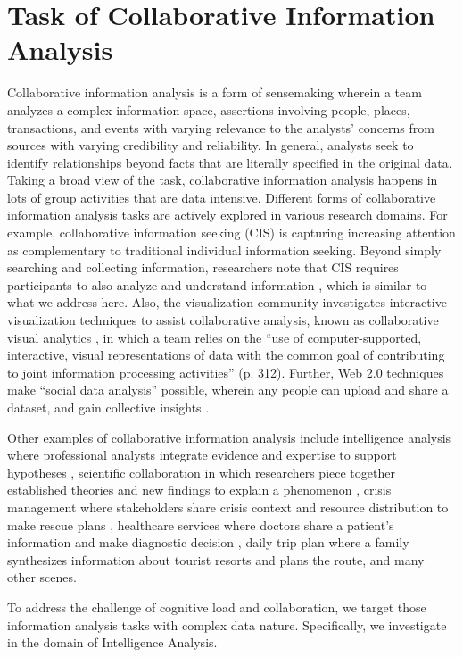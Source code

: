 \section{Task of Collaborative Information Analysis}

Collaborative information analysis is a form of sensemaking wherein a team
analyzes a complex information space, assertions involving people, places,
transactions, and events with varying relevance to the analysts’ concerns from
sources with varying credibility and reliability. In general,
analysts seek to identify relationships beyond facts that are literally specified in the original data. Taking a broad view of the task, collaborative information analysis happens in lots of group activities that are data intensive. Different forms of collaborative information analysis tasks
are actively explored in various research domains. For example, collaborative
information seeking (CIS) \citep{Shah2014i} is capturing increasing attention as
complementary to traditional individual information seeking. Beyond simply
searching and collecting information, researchers note that CIS requires
participants to also analyze and understand information \citep{Paul2010}, which is similar to what we address here. Also, the visualization
community investigates interactive visualization techniques to assist collaborative
analysis, known as collaborative visual analytics \citep{Isenberg2011}, in which a team relies on the
``use of computer-supported, interactive, visual representations of data with
the common goal of contributing to joint information processing activities''
(p. 312). Further, Web 2.0 techniques make ``social data
analysis'' possible, wherein any people can upload and share a dataset, and gain
collective insights \citep{Morton2014}.

Other examples of collaborative information analysis include
intelligence analysis where professional analysts integrate evidence and
expertise to support hypotheses \citep{Heuer1999}, scientific collaboration in
which researchers piece together established theories and new findings to
explain a phenomenon \citep{Farooq2009}, crisis management
where stakeholders share crisis context and resource distribution to make rescue
plans \citep{Tomaszewski2012b, Convertino2011}, healthcare services where doctors share
a patient’s information and make diagnostic decision \citep{Reddy2008c}, daily
trip plan where a family synthesizes information about tourist resorts and plans
the route, and many other scenes. 

To address the challenge of cognitive load and collaboration, we
target those information analysis tasks with complex data nature. Specifically, we investigate in the domain of Intelligence Analysis. 

